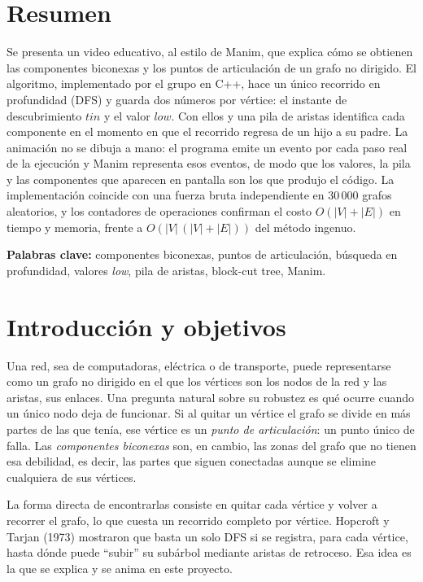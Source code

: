 \documentclass[11pt,a4paper]{article}
\numberwithin{equation}{section}
\newcommand{\tin}{\mathit{tin}}
\newcommand{\low}{\mathit{low}}
\begin{document}
\setcounter{page}{2}
\section{Resumen}
Se presenta un video educativo, al estilo de Manim, que explica cómo se obtienen las componentes biconexas y los puntos de articulación de un grafo no dirigido. El algoritmo, implementado por el grupo en C++, hace un único recorrido en profundidad (DFS) y guarda dos números por vértice: el instante de descubrimiento $\tin$ y el valor $\low$. Con ellos y una pila de aristas identifica cada componente en el momento en que el recorrido regresa de un hijo a su padre. La animación no se dibuja a mano: el programa emite un evento por cada paso real de la ejecución y Manim representa esos eventos, de modo que los valores, la pila y las componentes que aparecen en pantalla son los que produjo el código. La implementación coincide con una fuerza bruta independiente en 30\,000 grafos aleatorios, y los contadores de operaciones confirman el costo $O(|V|+|E|)$ en tiempo y memoria, frente a $O(|V|\,(|V|+|E|))$ del método ingenuo.

\medskip
\textbf{Palabras clave:} componentes biconexas, puntos de articulación, búsqueda en profundidad, valores \emph{low}, pila de aristas, block-cut tree, Manim.

\section{Introducción y objetivos}
\label{sec:intro}
Una red, sea de computadoras, eléctrica o de transporte, puede representarse como un grafo no dirigido en el que los vértices son los nodos de la red y las aristas, sus enlaces. Una pregunta natural sobre su robustez es qué ocurre cuando un único nodo deja de funcionar. Si al quitar un vértice el grafo se divide en más partes de las que tenía, ese vértice es un \emph{punto de articulación}: un punto único de falla. Las \emph{componentes biconexas} son, en cambio, las zonas del grafo que no tienen esa debilidad, es decir, las partes que siguen conectadas aunque se elimine cualquiera de sus vértices.

La forma directa de encontrarlas consiste en quitar cada vértice y volver a recorrer el grafo, lo que cuesta un recorrido completo por vértice. Hopcroft y Tarjan (1973) mostraron que basta un solo DFS si se registra, para cada vértice, hasta dónde puede ``subir'' su subárbol mediante aristas de retroceso. Esa idea es la que se explica y se anima en este proyecto.
\end{document}
